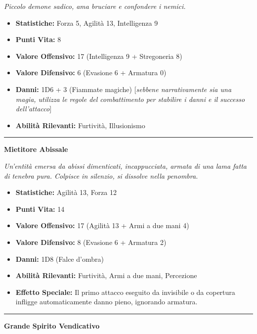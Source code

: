 \documentclass[../manuale_main.tex]{subfiles}
\begin{document}
\textit{Piccolo demone sadico, ama bruciare e confondere i nemici.}
\begin{itemize}
\item \textbf{Statistiche:} Forza 5, Agilità 13, Intelligenza 9
\item \textbf{Punti Vita:} 8
\item \textbf{Valore Offensivo:} 17 (Intelligenza 9 + Stregoneria 8)
\item \textbf{Valore Difensivo:} 6 (Evasione 6 + Armatura 0)
\item \textbf{Danni:} 1D6 + 3 (Fiammate magiche) [\textit{sebbene narrativamente sia una magia, utilizza le regole del combattimento per stabilire i danni e il successo dell'attacco}]
\item \textbf{Abilità Rilevanti:} Furtività, Illusionismo
\end{itemize}
\vspace{0.2cm}
\noindent
\begin{center}
\rule{\textwidth}{0.4pt} 
\end{center}
\vspace{0.2cm}
{\zarafirtitlefont\Large\bfseries\noindent Mietitore Abissale}

\vspace{0.2cm}
\textit{Un’entità emersa da abissi dimenticati, incappucciata, armata di una lama fatta di tenebra pura. Colpisce in silenzio, si dissolve nella penombra.}
\begin{itemize}
\item \textbf{Statistiche:} Agilità 13, Forza 12
\item \textbf{Punti Vita:} 14
\item \textbf{Valore Offensivo:} 17 (Agilità 13 + Armi a due mani 4)
\item \textbf{Valore Difensivo:} 8 (Evasione 6 + Armatura 2)
\item \textbf{Danni:} 1D8 (Falce d’ombra)
\item \textbf{Abilità Rilevanti:} Furtività, Armi a due mani, Percezione
\item \textbf{Effetto Speciale:} Il primo attacco eseguito da invisibile o da copertura infligge automaticamente danno pieno, ignorando armatura.
\end{itemize}
\vspace{0.2cm}
\noindent
\begin{center}
\rule{\textwidth}{0.4pt} 
\end{center}
\clearpage
{\zarafirtitlefont\Large\bfseries\noindent Grande Spirito Vendicativo}
\vspace{0.2cm}
\end{document}
